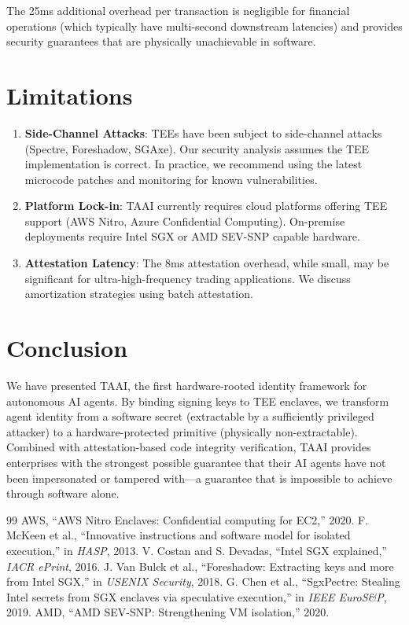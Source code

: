 \documentclass[conference]{IEEEtran}
\begin{document}
The 25ms additional overhead per transaction is negligible for financial operations (which typically have multi-second downstream latencies) and provides security guarantees that are physically unachievable in software.

\section{Limitations}

\begin{enumerate}
    \item \textbf{Side-Channel Attacks}: TEEs have been subject to side-channel attacks (Spectre, Foreshadow, SGAxe). Our security analysis assumes the TEE implementation is correct. In practice, we recommend using the latest microcode patches and monitoring for known vulnerabilities.
    \item \textbf{Platform Lock-in}: TAAI currently requires cloud platforms offering TEE support (AWS Nitro, Azure Confidential Computing). On-premise deployments require Intel SGX or AMD SEV-SNP capable hardware.
    \item \textbf{Attestation Latency}: The 8ms attestation overhead, while small, may be significant for ultra-high-frequency trading applications. We discuss amortization strategies using batch attestation.
\end{enumerate}

\section{Conclusion}

We have presented TAAI, the first hardware-rooted identity framework for autonomous AI agents. By binding signing keys to TEE enclaves, we transform agent identity from a software secret (extractable by a sufficiently privileged attacker) to a hardware-protected primitive (physically non-extractable). Combined with attestation-based code integrity verification, TAAI provides enterprises with the strongest possible guarantee that their AI agents have not been impersonated or tampered with---a guarantee that is impossible to achieve through software alone.

\begin{thebibliography}{99}
 AWS, ``AWS Nitro Enclaves: Confidential computing for EC2,'' 2020.
 F. McKeen et al., ``Innovative instructions and software model for isolated execution,'' in \textit{HASP}, 2013.
 V. Costan and S. Devadas, ``Intel SGX explained,'' \textit{IACR ePrint}, 2016.
 J. Van Bulck et al., ``Foreshadow: Extracting keys and more from Intel SGX,'' in \textit{USENIX Security}, 2018.
 G. Chen et al., ``SgxPectre: Stealing Intel secrets from SGX enclaves via speculative execution,'' in \textit{IEEE EuroS\&P}, 2019.
 AMD, ``AMD SEV-SNP: Strengthening VM isolation,'' 2020.
\end{thebibliography}
\end{document}
